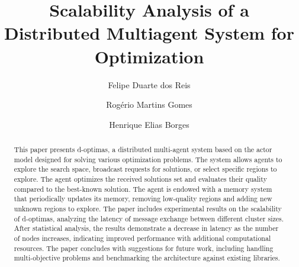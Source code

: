 \documentclass[preprint,12pt]{elsarticle}
\begin{document}
\begin{frontmatter}




\title{Scalability Analysis of a Distributed Multiagent System for Optimization}


\author[cefetmg]{Felipe Duarte dos Reis}


\author[cefetmg]{Rogério Martins Gomes}
\author[cefetmg]{Henrique Elias Borges}


\begin{abstract}
This paper presents d-optimas, a distributed multi-agent system based on the actor model designed for solving various optimization problems. The system allows agents to explore the search space, broadcast requests for solutions, or select specific regions to explore. The agent optimizes the received solutions set and evaluates their quality compared to the best-known solution. The agent is endowed with a memory system that periodically updates its memory, removing low-quality regions and adding new unknown regions to explore. The paper includes experimental results on the scalability of d-optimas, analyzing the latency of message exchange between different cluster sizes. After statistical analysis, the results demonstrate a decrease in latency as the number of nodes increases, indicating improved performance with additional computational resources. The paper concludes with suggestions for future work, including handling multi-objective problems and benchmarking the architecture against existing libraries.
\begin{comment}
o abstract foi feito por mim, mas não está legal. Tem que melhorar. De qualquer forma representa o que está apresentado no texto. \\


This paper presents a distributed multi-agent system based on the computation actor model, designed to solve various optimization problems. The system uses two types of agents, an initializer and a metaheuristic agent, and communication occurs via a conversation protocol. The proposed architecture is distributed, and its scalability is evaluated with an experimental approach. The data obtained show that the latency of the principal message types exchanged between actors tends to diminish under the same configuration.



\end{comment}
\end{abstract}
\end{frontmatter}
\end{document}

